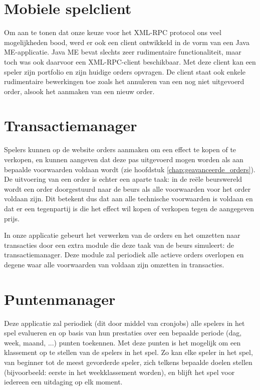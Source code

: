 \section{Mobiele spelclient}
Om aan te tonen dat onze keuze voor het XML-RPC protocol ons veel mogelijkheden bood, werd er ook een client ontwikkeld in de vorm van een Java ME-applicatie. Java ME bevat slechts zeer rudimentaire functionaliteit, maar toch was ook daarvoor een XML-RPC-client beschikbaar.
Met deze client kan een speler zijn portfolio en zijn huidige orders opvragen. De client staat ook enkele rudimentaire bewerkingen toe zoals het annuleren van een nog niet uitgevoerd order, alsook het aanmaken van een nieuw order.

\section{Transactiemanager}
Spelers kunnen op de website orders aanmaken om een effect te kopen of te verkopen, en kunnen aangeven dat deze pas uitgevoerd mogen worden als aan bepaalde voorwaarden voldaan wordt (zie hoofdstuk \ref{chap:geavanceerde_orders}). De uitvoering van een order is echter een aparte taak: in de re\"ele beurswereld wordt een order doorgestuurd naar de beurs als alle voorwaarden voor het order voldaan zijn. Dit betekent dus dat aan alle technische voorwaarden is voldaan en dat er een tegenpartij is die het effect wil kopen of verkopen tegen de aangegeven prijs.

In onze applicatie gebeurt het verwerken van de orders en het omzetten naar transacties door een extra module die deze taak van de beurs simuleert: de transactiemanager. Deze module zal periodiek alle actieve orders overlopen en degene waar alle voorwaarden van voldaan zijn omzetten in transacties.

\section{Puntenmanager}
Deze applicatie zal periodiek (dit door middel van cronjobs) alle spelers in het spel evalueren en op basis van hun prestaties over een bepaalde periode (dag, week, maand, ...) punten toekennen. Met deze punten is het mogelijk om een klassement op te stellen van de spelers in het spel. Zo kan elke speler in het spel, van beginner tot de meest gevorderde speler, zich telkens bepaalde doelen stellen (bijvoorbeeld: eerste in het weekklassement worden), en blijft het spel voor iedereen een uitdaging op elk moment.


